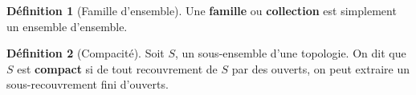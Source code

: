 \documentclass[12pt]{book}
\theoremstyle{definition}
\newtheorem{definition}{Définition}[section]
\begin{document}
\begin{definition}[Famille d'ensemble]
    \label{def:famille}
    Une \textbf{famille} ou \textbf{collection} est simplement un ensemble d'ensemble.
\end{definition}

\begin{definition}[Compacité]
    \label{def:compacite}
    Soit $S$, un sous-ensemble d'une topologie. On dit que $S$ est \textbf{compact} si de tout recouvrement de $S$ par des ouverts, 
    on peut extraire un sous-recouvrement fini d'ouverts.
\end{definition}
\end{document}
